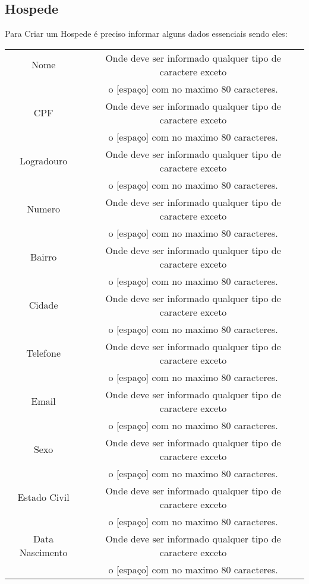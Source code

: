\documentclass[titlepage]{article}
\begin{document}
				\subsection{Hospede}
				Para Criar um Hospede é preciso informar alguns dados essenciais sendo eles:\\
				\begin{table}[h]%
					\begin{tabular}{|c|c|}
						\hline
						Nome  &Onde deve ser informado qualquer tipo de caractere exceto  \\ & o [espaço] com no maximo 80 caracteres.\\
						\hline
						CPF &Onde deve ser informado qualquer tipo de caractere exceto  \\ & o [espaço] com no maximo 80 caracteres.\\
						\hline
						Logradouro &Onde deve ser informado qualquer tipo de caractere exceto  \\ & o [espaço] com no maximo 80 caracteres.\\
						\hline
						Numero &Onde deve ser informado qualquer tipo de caractere exceto  \\ & o [espaço] com no maximo 80 caracteres.\\
						\hline
						Bairro &Onde deve ser informado qualquer tipo de caractere exceto  \\ & o [espaço] com no maximo 80 caracteres.\\
						\hline
						Cidade &Onde deve ser informado qualquer tipo de caractere exceto  \\ & o [espaço] com no maximo 80 caracteres.\\
						\hline
						Telefone &Onde deve ser informado qualquer tipo de caractere exceto  \\ & o [espaço] com no maximo 80 caracteres.\\
						\hline
						Email &Onde deve ser informado qualquer tipo de caractere exceto  \\ & o [espaço] com no maximo 80 caracteres.\\
						\hline
						Sexo &Onde deve ser informado qualquer tipo de caractere exceto  \\ & o [espaço] com no maximo 80 caracteres.\\
						\hline
						Estado Civil &Onde deve ser informado qualquer tipo de caractere exceto  \\ & o [espaço] com no maximo 80 caracteres.\\
						\hline
						Data Nascimento &Onde deve ser informado qualquer tipo de caractere exceto  \\ & o [espaço] com no maximo 80 caracteres.\\
						\hline
					\end{tabular}
				\end{table}
\end{document}
